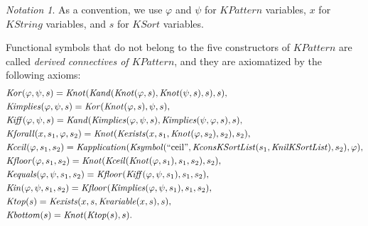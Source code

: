 \documentclass[UTF8,11pt]{article}
\newcounter{thmcounter}
\theoremstyle{plain}
\theoremstyle{definition}
\theoremstyle{remark}
\newtheorem{notation}   [thmcounter]{Notation}
\newcommand{\KString}{\mathit{KString}}
\newcommand{\KSort}{\mathit{KSort}}
\newcommand{\Ksymbol}{\mathit{Ksymbol}}
\newcommand{\KnilKSortList}{\mathit{KnilKSortList}}
\newcommand{\KconsKSortList}{\mathit{KconsKSortList}}
\newcommand{\KPattern}{\mathit{KPattern}}
\newcommand{\Kvariable}{\mathit{Kvariable}}
\newcommand{\Kand}{\mathit{Kand}}
\newcommand{\Kor}{\mathit{Kor}}
\newcommand{\Kimplies}{\mathit{Kimplies}}
\newcommand{\Kiff}{\mathit{Kiff}}
\newcommand{\Knot}{\mathit{Knot}}
\newcommand{\Kapplication}{\mathit{Kapplication}}
\newcommand{\Kexists}{\mathit{Kexists}}
\newcommand{\Kforall}{\mathit{Kforall}}
\newcommand{\Kequals}{\mathit{Kequals}}
\newcommand{\Kin}{\mathit{Kin}}
\newcommand{\Ktop}{\mathit{Ktop}}
\newcommand{\Kbottom}{\mathit{Kbottom}}
\newcommand{\Kfloor}{\mathit{Kfloor}}
\newcommand{\Kceil}{\mathit{Kceil}}
\newcommand{\quot}[1]{\mathrm{``#1"}}
\begin{document}
\begin{notation}\label{notation:variables-about-KPattern}
	As a convention, we use $\varphi$ and $\psi$ for $\KPattern$ variables, $x$ for $\KString$ variables, and $s$ for $\KSort$ variables.  
\end{notation}

Functional symbols that do not belong to the five constructors of $\KPattern$ are called \emph{derived connectives of $\KPattern$}, and they are axiomatized by the following axioms:
\begin{align*}
  & \Kor(\varphi, \psi, s) = \Knot(\Kand(\Knot(\varphi, s), \Knot(\psi, s), s), s),
  \\
  & \Kimplies(\varphi, \psi, s) = \Kor(\Knot(\varphi, s), \psi, s),
  \\
  & \Kiff(\varphi, \psi, s) = \Kand(\Kimplies(\varphi, \psi, s), \Kimplies(\psi, \varphi, s), s),
  \\
  & \Kforall(x, s_1, \varphi, s_2) = \Knot(\Kexists(x, s_1, \Knot(\varphi, s_2), s_2), s_2),
  \\
  & \Kceil(\varphi, s_1, s_2) =
    \Kapplication(\Ksymbol(\quot{ceil}, \KconsKSortList(s_1, \KnilKSortList), s_2), \varphi),
  \\
  & \Kfloor(\varphi, s_1, s_2) = \Knot(\Kceil(\Knot(\varphi, s_1), s_1, s_2), s_2),
  \\
  & \Kequals(\varphi, \psi, s_1, s_2) = \Kfloor(\Kiff(\varphi, \psi, s_1), s_1, s_2),
  \\
  & \Kin(\varphi, \psi, s_1, s_2) = \Kfloor(\Kimplies(\varphi, \psi, s_1), s_1, s_2),
  \\
  & \Ktop(s) = \Kexists(x, s, \Kvariable(x, s), s),
  \\
  & \Kbottom(s) = \Knot(\Ktop(s), s).
\end{align*}
\end{document}
